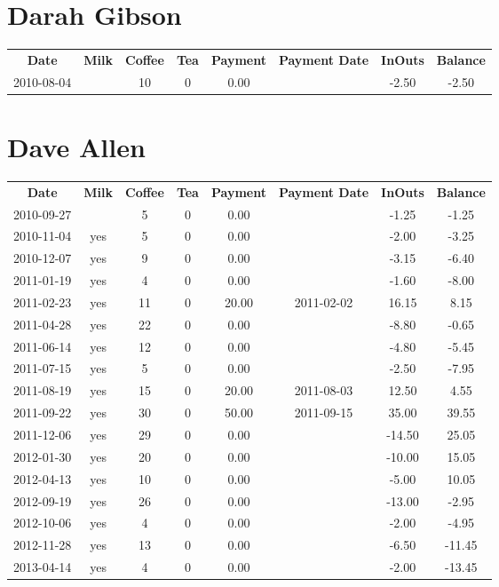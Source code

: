 \section{Darah Gibson}

\begin{center}
\begin{tabular}{cccccccc}
\textbf{Date} & \textbf{Milk} & \textbf{Coffee} & \textbf{Tea} & \textbf{Payment} & \textbf{Payment Date} & \textbf{InOuts} & \textbf{Balance} \\
2010-08-04 &  & 10 & 0 & 0.00 &  & -2.50 & -2.50
\end{tabular}
\end{center}

\section{Dave Allen}

\begin{center}
\begin{tabular}{cccccccc}
\textbf{Date} & \textbf{Milk} & \textbf{Coffee} & \textbf{Tea} & \textbf{Payment} & \textbf{Payment Date} & \textbf{InOuts} & \textbf{Balance} \\
2010-09-27 &  &  5 & 0 &  0.00 &  &  -1.25 &  -1.25\\ 
2010-11-04 & yes &  5 & 0 &  0.00 &  &  -2.00 &  -3.25\\ 
2010-12-07 & yes &  9 & 0 &  0.00 &  &  -3.15 &  -6.40\\ 
2011-01-19 & yes &  4 & 0 &  0.00 &  &  -1.60 &  -8.00\\ 
2011-02-23 & yes & 11 & 0 & 20.00 & 2011-02-02 &  16.15 &   8.15\\ 
2011-04-28 & yes & 22 & 0 &  0.00 &  &  -8.80 &  -0.65\\ 
2011-06-14 & yes & 12 & 0 &  0.00 &  &  -4.80 &  -5.45\\ 
2011-07-15 & yes &  5 & 0 &  0.00 &  &  -2.50 &  -7.95\\ 
2011-08-19 & yes & 15 & 0 & 20.00 & 2011-08-03 &  12.50 &   4.55\\ 
2011-09-22 & yes & 30 & 0 & 50.00 & 2011-09-15 &  35.00 &  39.55\\ 
2011-12-06 & yes & 29 & 0 &  0.00 &  & -14.50 &  25.05\\ 
2012-01-30 & yes & 20 & 0 &  0.00 &  & -10.00 &  15.05\\ 
2012-04-13 & yes & 10 & 0 &  0.00 &  &  -5.00 &  10.05\\ 
2012-09-19 & yes & 26 & 0 &  0.00 &  & -13.00 &  -2.95\\ 
2012-10-06 & yes &  4 & 0 &  0.00 &  &  -2.00 &  -4.95\\ 
2012-11-28 & yes & 13 & 0 &  0.00 &  &  -6.50 & -11.45\\ 
2013-04-14 & yes &  4 & 0 &  0.00 &  &  -2.00 & -13.45
\end{tabular}
\end{center}

